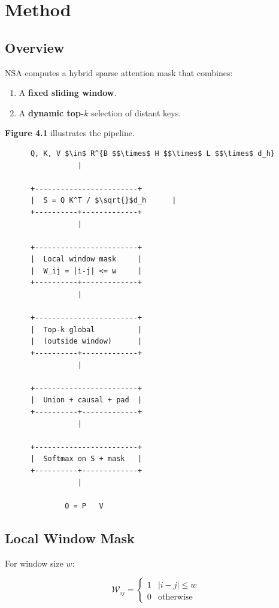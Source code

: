 
\section{Method}

\subsection{Overview}

NSA computes a hybrid sparse attention mask that combines:
\begin{enumerate}
\item A \textbf{fixed sliding window}.
\item A \textbf{dynamic top-$k$} selection of distant keys.

\end{enumerate}
\textbf{Figure 4.1} illustrates the pipeline.

\begin{lstlisting}
      Q, K, V $\in$ R^{B $$\times$ H $$\times$ L $$\times$ d_h}
                 |
                  
      +------------------------+
      |  S = Q K^T / $\sqrt{}$d_h      |
      +----------+-------------+
                 |
                  
      +------------------------+
      |  Local window mask     |
      |  W_ij = |i-j| <= w     |
      +----------+-------------+
                 |
                  
      +------------------------+
      |  Top-k global          |
      |  (outside window)      |
      +----------+-------------+
                 |
                  
      +------------------------+
      |  Union + causal + pad  |
      +----------+-------------+
                 |
                  
      +------------------------+
      |  Softmax on S + mask   |
      +----------+-------------+
                 |
                  
              O = P   V
\end{lstlisting}

\subsection{Local Window Mask}

For window size $w$:

\[
\mathcal{W}_{ij} = \begin{cases} 1 & |i - j| \leq w \\ 0 & \text{otherwise} \end{cases}
\tag{4.1}
\]

